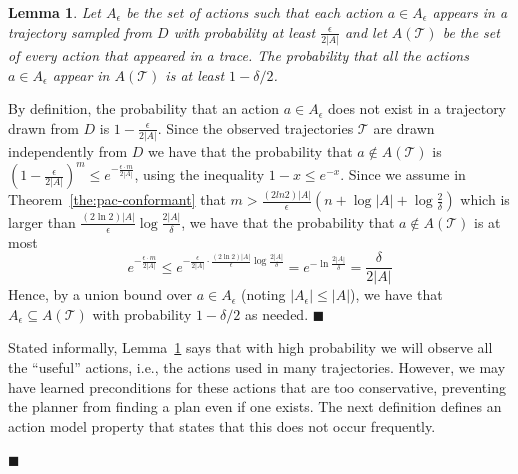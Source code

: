 \documentclass{article}
\newtheorem{lemma}{Lemma}
\newenvironment{proof}{\noindent{\bf Proof:~~}}{\qed}
\newcommand{\qed}{\hfill\ensuremath{\blacksquare}}
\begin{document}
\begin{proof}
		\begin{lemma}
			Let $A_\epsilon$ be the set of actions such that each action $a\in A_\epsilon$ appears in a trajectory sampled from $D$ with probability at least $\frac{\epsilon}{2|A|}$ and let $A(\mathcal{T})$ be the set of every action that appeared in a trace. 
			The probability that all the actions $a\in A_\epsilon$ 
			appear in $A(\mathcal{T})$ is at least $1-\delta/2$.
			\label{lem:sufficientActions}
		\end{lemma}
		\begin{proof}
			By definition, the probability that an action $a\in A_\epsilon$ does not exist in a trajectory drawn from $D$ is $1-\frac{\epsilon}{2|A|}$. 
			Since the observed trajectories $\mathcal{T}$ are drawn independently from $D$ we have that the probability that $a\notin A(\mathcal{T})$ is
			$(1-\frac{\epsilon}{2|A|})^m\leq e^{-\frac{\epsilon\cdot m}{2|A|}}$, 
			using the inequality $1-x\leq e^{-x}$. 
			Since we assume in Theorem~\ref{the:pac-conformant} that $m>\frac{(2ln 2)|A|}{\epsilon}(n+\log |A|+\log\frac{2}{\delta})$
			which is larger than $\frac{(2\ln 2)|A|}{\epsilon}\log\frac{2|A|}{\delta}$, 
			we have that the probability that $a\notin A(\mathcal{T})$ is at most 
			\begin{equation}
			e^{-\frac{\epsilon\cdot m}{2|A|}}
			\leq e^{-\frac{\epsilon}{2|A|} \cdot \frac{(2\ln 2)|A|}{\epsilon}\log\frac{2|A|}{\delta}}
			=e^{-\ln\frac{2|A|}{\delta}}=\frac{\delta}{2|A|}
			\end{equation}
			Hence, by a union bound over $a\in A_\epsilon$ (noting $|A_\epsilon|\leq |A|$), we have that $A_\epsilon\subseteq A(\mathcal{T})$ with probability $1-\delta/2$ as needed.
		\end{proof}
		
		Stated informally, Lemma~\ref{lem:sufficientActions} says that with high probability we will observe
		all the ``useful'' actions, i.e., the actions used in many trajectories. However, we may have learned 
		preconditions for these actions that are too conservative, 
		preventing the planner from finding a plan even if one exists. 
		The next definition defines an action model property that states that this does not occur frequently. 
		
		

\end{proof}
\end{document}
